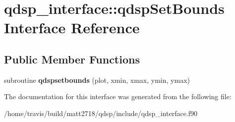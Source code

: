 \hypertarget{interfaceqdsp__interface_1_1qdspSetBounds}{\section{qdsp\-\_\-interface\-:\-:qdsp\-Set\-Bounds Interface Reference}
\label{interfaceqdsp__interface_1_1qdspSetBounds}
}
\subsection*{Public Member Functions}
\begin{DoxyCompactItemize}
\item 
\hypertarget{interfaceqdsp__interface_1_1qdspSetBounds_a7fbb9eef1ce7ba898461800fb48f2989}{subroutine {\bfseries qdspsetbounds} (plot, xmin, xmax, ymin, ymax)}\label{interfaceqdsp__interface_1_1qdspSetBounds_a7fbb9eef1ce7ba898461800fb48f2989}

\end{DoxyCompactItemize}


The documentation for this interface was generated from the following file\-:\begin{DoxyCompactItemize}
\item 
/home/travis/build/matt2718/qdsp/include/qdsp\-\_\-interface.\-f90\end{DoxyCompactItemize}
